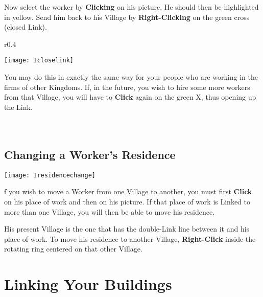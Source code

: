 Now select the worker by \textbf{Clicking} on his picture. He should then be highlighted in yellow. Send him back to his Village by \textbf{Right-Clicking} on the green cross (closed Link).

\begin{wrapfigure}{r}{0.4\textwidth}
	\vspace{-20pt}
	\begin{center}
		\texttt{[image: Icloselink]} %
	\end{center}
	\vspace{-10pt}
\end{wrapfigure}

You may do this in exactly the same way for your people who are working in the firms of other Kingdoms. If, in the future, you wish to hire some more workers from that Village, you will have to \textbf{Click} again on the green X, thus opening up the Link. \\ \\ \\ %

\subsection{\textsf{Changing a Worker’s Residence}}


\begin{center}
    \texttt{[image: Iresidencechange]} %
\end{center}

f you wish to move a Worker from one Village to another, you must first \textbf{Click} on his place of work and then on his picture. If that place of work is Linked to more than one Village, you will then be able to move his residence.

His present Village is the one that has the double-Link line between it and his place of work. To move his residence to another Village, \textbf{Right-Click} inside the rotating ring centered on that other Village.

\section{\textsf{Linking Your Buildings}}


